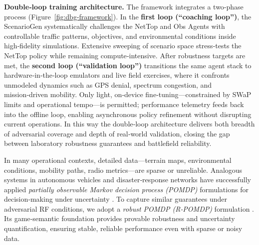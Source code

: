 \documentclass[doc.tex]{subfiles}
\begin{document}
\textbf{Double‑loop training architecture.} The framework integrates a two‑phase process (Figure~\ref{fig:dbg-framework}). In the \textbf{first loop (“coaching loop”)}, the ScenarioGen systematically challenges the NetTop and Obs Agents with controllable traffic patterns, objectives, and environmental conditions inside high‑fidelity simulations. Extensive sweeping of scenario space stress‑tests the NetTop policy while remaining compute‑intensive. After robustness targets are met, the \textbf{second loop (“validation loop”)} transitions the same agent stack to hardware‑in‑the‑loop emulators and live field exercises, where it confronts unmodeled dynamics such as GPS denial, spectrum congestion, and mission‑driven mobility. Only light, on‑device fine‑tuning—constrained by SWaP limits and operational tempo—is permitted; performance telemetry feeds back into the offline loop, enabling asynchronous policy refinement without disrupting current operations. In this way the double‑loop architecture delivers both breadth of adversarial coverage and depth of real‑world validation, closing the gap between laboratory robustness guarantees and battlefield reliability.

In many operational contexts, detailed data—terrain maps, environmental
conditions, mobility paths, radio metrics—are sparse or unreliable.
Analogous systems in autonomous vehicles and disaster‑response networks
have successfully applied \emph{partially observable Markov decision
process (POMDP)} formulations for decision‑making under
uncertainty \cite{schwarting2018planning,alsheikh2015markov,lee2021multi}.
To capture similar guarantees under adversarial RF conditions, we adopt
a \emph{robust POMDP (R‑POMDP)} formulation \cite{bovy2024robust}.  Its
game‑semantic foundation provides provable robustness and uncertainty
quantification, ensuring stable, reliable performance even with sparse
or noisy data.
\end{document}

